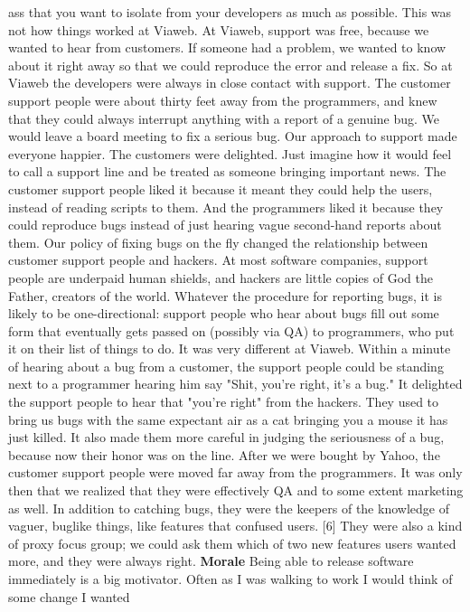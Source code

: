 ass that you want to isolate from your developers as much as
possible.
This was not how things worked at Viaweb.  At Viaweb, support was
free, because we wanted to hear from customers.  If someone had a
problem, we wanted to know about it right away so that we could
reproduce the error and release a fix.
So at Viaweb the developers were always in close contact with
support.  The customer support people were about thirty feet away
from the programmers, and knew that they could always interrupt
anything with a report of a genuine bug.  We would leave a board
meeting to fix a serious bug.
Our approach to support made everyone happier.  The customers were
delighted.  Just imagine how it would feel to call a support line
and be treated as someone bringing important news.  The customer
support people liked it because it meant they could help the users,
instead of reading scripts to them.  And the programmers liked it
because they could reproduce bugs instead of just hearing vague
second-hand reports about them.
Our policy of fixing bugs on the fly changed the relationship
between customer support people and hackers.  At most software
companies, support people are underpaid human shields, and hackers
are little copies of God the Father, creators of the world.  Whatever
the procedure for reporting bugs, it is likely to be one-directional:
support people who hear about bugs fill out some form that eventually
gets passed on (possibly via QA) to programmers, who put it on
their list of things to do.  It was very different at Viaweb.
Within a minute of hearing about a bug from a customer, the support
people could be standing next to a programmer hearing him say "Shit,
you're right, it's a bug." It delighted the support people to hear
that "you're right" from the hackers.  They used to bring us bugs
with the same expectant air as a cat bringing you a mouse it has
just killed.   It also made them more careful in judging the
seriousness of a bug, because now their honor was on the line.
After we were bought by Yahoo, the customer support people were
moved far away from the programmers.  It was only then that we
realized that they were effectively QA and to some extent marketing
as well.  In addition to catching bugs, they were the keepers of
the knowledge of vaguer, buglike things, like features that confused
users. [6]  They were also a kind of proxy focus group; we could
ask them which of two new features users wanted more, and they were
always right.
\textbf{Morale}
Being able to release software immediately is a big motivator.
Often as I was walking to work I would think of some change I wanted
